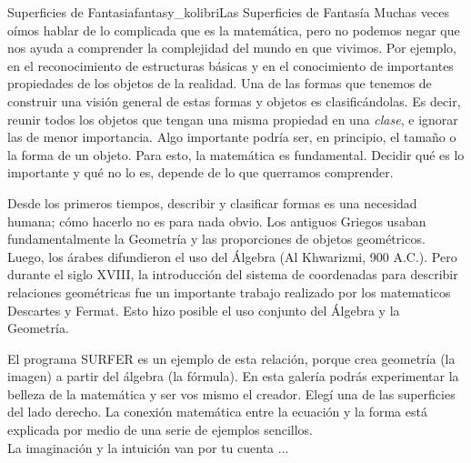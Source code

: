 \begin{surferIntroPage}{Superficies de Fantasia}{fantasy_kolibri}{Las Superficies de Fantasía}
Muchas veces oímos hablar de lo complicada que es la matemática, pero no podemos negar que nos ayuda a comprender la complejidad del mundo en que vivimos. Por ejemplo, en el reconocimiento de estructuras básicas y en el conocimiento de importantes propiedades de los objetos de la realidad. Una de las formas que tenemos de construir una visión general de estas formas y objetos es clasificándolas. Es decir, reunir todos los objetos que tengan una misma propiedad en una \textit{clase}, e ignorar las de menor importancia. Algo importante podría ser, en principio, el tamaño o la forma de un objeto. Para esto, la matemática es fundamental. Decidir qué es lo importante y qué no lo es, depende de lo que querramos comprender.

Desde los primeros tiempos, describir y clasificar formas es una necesidad humana; cómo hacerlo no es para nada obvio. Los antiguos Griegos usaban fundamentalmente la Geometría y las proporciones de objetos geométricos. Luego, los árabes difundieron el uso del Álgebra (Al Khwarizmi, 900 A.C.). Pero durante el siglo XVIII, la introducción del sistema de coordenadas para describir relaciones geométricas fue un importante trabajo realizado por los matematicos Descartes y Fermat. Esto hizo posible el uso conjunto del Álgebra y la Geometría.

El programa SURFER es un ejemplo de esta relación, porque crea geometría (la imagen) a partir del álgebra (la fórmula).
En esta galería podrás experimentar la belleza de la matemática y ser vos mismo el creador. Elegí una de las superficies del lado derecho. La conexión matemática entre la ecuación y la forma está explicada por medio de una serie de ejemplos sencillos. \\
La imaginación y la intuición van por tu cuenta ...
\end{surferIntroPage}
